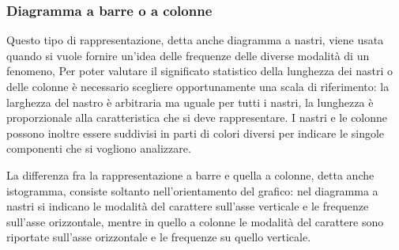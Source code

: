 \subsubsection{Diagramma a barre o a colonne}
\vspace{-6pt}
\begin{multicols}{2}
Questo tipo di rappresentazione, detta anche diagramma a nastri, viene usata 
quando si vuole fornire un'idea delle frequenze
delle diverse modalità di un fenomeno, 
Per poter valutare il significato statistico della lunghezza dei nastri o 
delle colonne è necessario scegliere opportunamente una scala di 
riferimento:
la larghezza del nastro è arbitraria ma uguale per tutti i nastri, la 
lunghezza è proporzionale alla caratteristica che si deve rappresentare.
I nastri e le colonne possono inoltre essere suddivisi in parti di colori 
diversi per indicare le singole componenti 
che si vogliono analizzare.

La differenza fra la rappresentazione a barre e quella a colonne, detta 
anche istogramma, consiste soltanto
nell'orientamento del grafico: nel diagramma a nastri si indicano le 
modalità del carattere sull'asse verticale e le frequenze sull'asse 
orizzontale, mentre in quello a colonne le modalità del carattere sono 
riportate sull'asse orizzontale e le frequenze su quello verticale.\\


\begin{center}
\begin{inaccessibleblock}

\end{inaccessibleblock}
\end{center}

\begin{center}
 \begin{inaccessibleblock}

\end{inaccessibleblock}
\end{center}

\end{multicols}

% 
% 
% 


